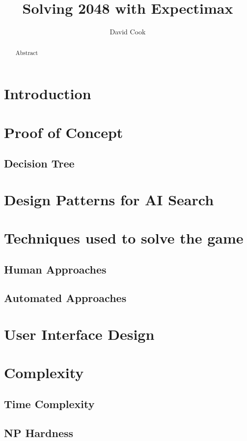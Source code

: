 \documentclass{article}
\title{Solving 2048 with Expectimax}
\author{David Cook}
\begin{document}
\maketitle

\tableofcontents

\begin{abstract}
Abstract
\end{abstract}

\section{Introduction}
\label{sec:intro}

\section{Proof of Concept}
\label{sec:proof_of_concept}
\subsection{Decision Tree}
\label{subsec:tree}

\section{Design Patterns for AI Search}
\label{sec:dp}

\section{Techniques used to solve the game}
\label{sec:techniques}

\subsection{Human Approaches}
\label{subsec:human_techniques}

\subsection{Automated Approaches}
\label{subsec:automated_techniques}

\section{User Interface Design}
\label{sec:ui}

\section{Complexity}
\label{sec:complexity}

\subsection{Time Complexity}
\label{subsec:time_comp}

\subsection{NP Hardness}
\label{subsec:np_hardness}

\end{document}
